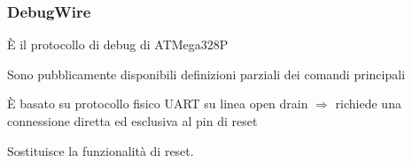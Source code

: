 \documentclass[aspectratio=169,
]{beamer}
\begin{document}
    \begin{frame}
        \frametitle{DebugWire}
    
        È il protocollo di debug di ATMega328P\pause
        
        Sono pubblicamente disponibili definizioni parziali dei comandi principali\pause

        È basato su protocollo fisico UART su linea open drain $\Rightarrow$ richiede una connessione diretta ed esclusiva al pin di reset\pause

        Sostituisce la funzionalità di reset.
    \end{frame}

%
\end{document}
